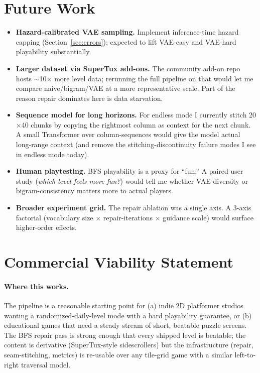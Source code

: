 \documentclass[11pt]{article}
\begin{document}
\section{Future Work}

\begin{itemize}
    \item \textbf{Hazard-calibrated VAE sampling.} Implement
    inference-time hazard capping (Section~\ref{sec:errors}); expected
    to lift VAE-easy and VAE-hard playability substantially.
    \item \textbf{Larger dataset via SuperTux add-ons.} The community
    add-on repo hosts $\sim$10$\times$ more level data; rerunning the
    full pipeline on that would let me compare naive/bigram/VAE at a
    more representative scale. Part of the reason repair dominates
    here is data starvation.
    \item \textbf{Sequence model for long horizons.} For endless mode
    I currently stitch 20$\times$40 chunks by copying the rightmost
    column as context for the next chunk. A small Transformer over
    column-sequences would give the model actual long-range context
    (and remove the stitching-discontinuity failure modes I see in
    endless mode today).
    \item \textbf{Human playtesting.} BFS playability is a proxy for
    ``fun.'' A paired user study (\emph{which level feels more fun?})
    would tell me whether VAE-diversity or bigram-consistency matters
    more to actual players.
    \item \textbf{Broader experiment grid.} The repair ablation was a
    single axis. A 3-axis factorial (vocabulary size $\times$
    repair-iterations $\times$ guidance scale) would surface
    higher-order effects.
\end{itemize}

\section{Commercial Viability Statement}

\paragraph{Where this works.} The pipeline is a reasonable starting
point for (a) indie 2D platformer studios wanting a
randomized-daily-level mode with a hard playability guarantee, or
(b) educational games that need a steady stream of short, beatable
puzzle screens. The BFS repair pass is strong enough that every
shipped level is beatable; the content is derivative (SuperTux-style
sidescrollers) but the infrastructure (repair, seam-stitching,
metrics) is re-usable over any tile-grid game with a similar
left-to-right traversal model.
\end{document}

